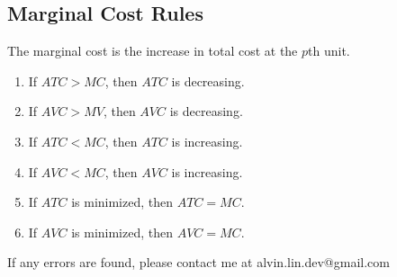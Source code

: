 \documentclass[letterpaper, 12pt]{article}
\begin{document}
\subsection{Marginal Cost Rules}
The marginal cost is the increase in total cost at the \( p \)th unit.
\begin{enumerate}
  \item If \( ATC > MC \), then \( ATC \) is decreasing.
  \item If \( AVC > MV \), then \( AVC \) is decreasing.
  \item If \( ATC < MC \), then \( ATC \) is increasing.
  \item If \( AVC < MC \), then \( AVC \) is increasing.
  \item If \( ATC \) is minimized, then \( ATC = MC \).
  \item If \( AVC \) is minimized, then \( AVC = MC \).
\end{enumerate}

\begin{center}
  If any errors are found, please contact me at alvin.lin.dev@gmail.com
\end{center}
\end{document}
